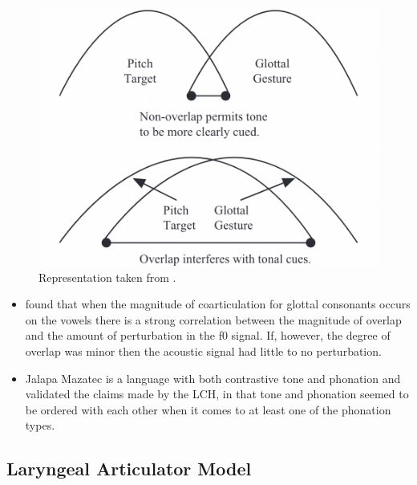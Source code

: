 \documentclass[12pt, letterpaper]{article}
\begin{document}
	\begin{figure}[!ht]
		\centering
		\includegraphics[width=.5\textwidth]{../Gestures.png}
		\caption{Representation taken from \citet{dicanioCoarticulationToneGlottal2012}.}
		\label{fig:GlottalGestures}
	\end{figure}
\begin{itemize}
	\item \citet{dicanioCoarticulationToneGlottal2012} found that when the magnitude of coarticulation for glottal consonants occurs on the vowels there is a strong correlation between the magnitude of overlap and the amount of perturbation in the f0 signal. If, however, the degree of overlap was minor then the acoustic signal had little to no perturbation.
	\item Jalapa Mazatec is a language with both contrastive tone and phonation and \citet{garellekAcousticConsequencesPhonation2011} validated the claims made by the LCH, in that tone and phonation seemed to be ordered with each other when it comes to at least one of the phonation types.
\end{itemize}

\subsection{Laryngeal Articulator Model} \label{sec:LAM}
\end{document}
